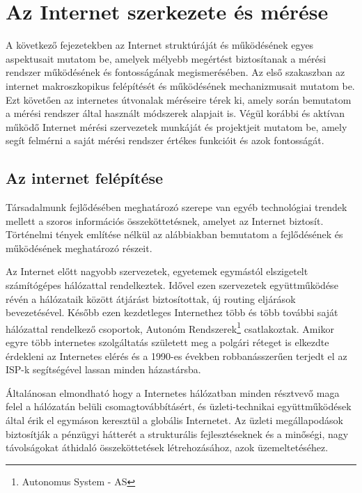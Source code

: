 \chapter{Az Internet szerkezete és mérése}

A következő fejezetekben az Internet struktúráját és működésének egyes aspektusait mutatom be, amelyek mélyebb megértést biztosítanak a mérési rendszer működésének és fontosságának megismerésében.
Az első szakaszban az internet makroszkopikus felépítését és működésének mechanizmusait mutatom be. Ezt követően az internetes útvonalak méréseire térek ki, amely során bemutatom a mérési rendszer által használt módszerek alapjait is. Végül korábbi és aktívan működő Internet mérési szervezetek munkáját és projektjeit mutatom be, amely segít felmérni a saját mérési rendszer értékes funkcióit és azok fontosságát.



\section{Az internet felépítése}



Társadalmunk fejlődésében meghatározó szerepe van egyéb technológiai trendek mellett a szoros információs összeköttetésnek, amelyet az Internet biztosít. Történelmi tények említése nélkül az alábbiakban bemutatom a fejlődésének és működésének meghatározó részeit.

Az Internet előtt nagyobb szervezetek, egyetemek egymástól elszigetelt számítógépes hálózattal rendelkeztek. Idővel ezen szervezetek együttműködése révén a hálózataik között átjárást biztosítottak, új routing eljárások bevezetésével. Később ezen kezdetleges Internethez több és több további saját hálózattal rendelkező csoportok, Autonóm Rendszerek\footnote{Autonomus System - AS} csatlakoztak. Amikor egyre több internetes szolgáltatás született meg a polgári réteget is elkezdte érdekleni az Internetes elérés és a 1990-es években robbanásszerűen terjedt el az ISP-k segítségével lassan minden házastársba.

Általánosan elmondható hogy a Internetes hálózatban minden résztvevő maga felel a hálózatán belüli csomagtovábbításért, és üzleti-technikai együttműködések által érik el egymáson keresztül a globális Internetet. Az üzleti megállapodások biztosítják a pénzügyi hátterét a strukturális fejlesztéseknek és a minőségi, nagy távolságokat áthidaló összeköttetések létrehozásához, azok üzemeltetéséhez.

